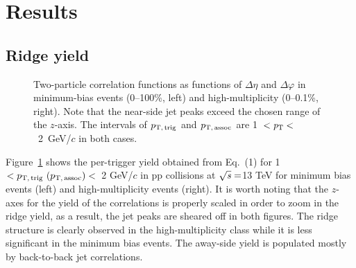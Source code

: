 
\section {Results}
\label{sec:results}

\subsection{Ridge yield}
\label{sec:resultunbiased}
\begin{figure}[b!]
	\centering
	\caption{ Two-particle correlation functions as functions of $\Delta\eta$ and $\Delta\varphi$ in minimum-bias events (0--100\%, left) and high-multiplicity (0--0.1\%, right). Note that the near-side jet peaks exceed the chosen range of the $z$-axis. The intervals of $p_\mathrm{T,\,trig}$ and $p_\mathrm{T,\,assoc}$ are 1~$<\it{p}_{\rm{T}}<$~2~GeV/$c$ in both cases.}
	\label{fig:PlotCorrMBHMT}
\end{figure}

Figure~\ref{fig:PlotCorrMBHMT} shows the per-trigger yield obtained from Eq.~(1) for 1~$<p_\mathrm{T,\,trig}~\mathrm (p_\mathrm{T,\,assoc})<$~2 GeV/$c$ in pp collisions at $\sqrt{\it{s}} = $\unit{13} {\rm{}TeV} for minimum bias events (left) and high-multiplicity events (right). It is worth noting that the $z$-axes for the yield of the correlations is properly scaled in order to zoom in the ridge yield, as a result, the jet peaks are sheared off in both figures. The ridge structure is clearly observed in the high-multiplicity class while it is less significant in the minimum bias events. The away-side yield is populated mostly by back-to-back jet correlations.

